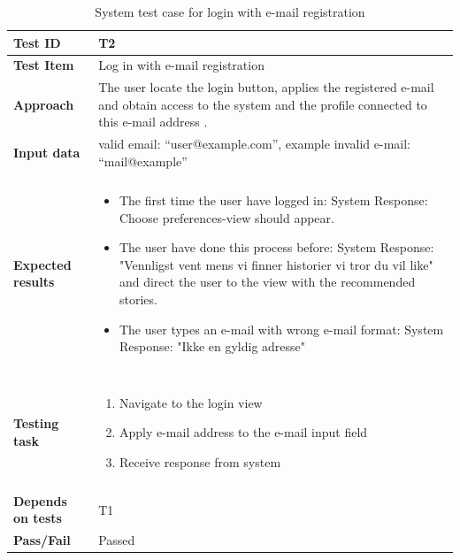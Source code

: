 \begin{appendices}
	\begin{table}[H]
		\small
		\centering
		\caption{System test case for login with e-mail registration}
		\begin{tabular}{ | l | l  |}
			\hline
			\textbf{Test ID} & T2  \\ \hline 
			\textbf{Test Item} & Log in with e-mail registration \\ \hline
			\textbf{Approach} & \begin{minipage}{5in}The user locate the login button, applies the registered e-mail and obtain access to the system and the profile connected to this e-mail address . \end{minipage}\\ \hline
			\textbf{Input data} &  valid email: “user@example.com”, \newline example invalid e-mail: “mail@example”\\ \hline&\\[-3.8ex]
			\textbf{Expected results} & \begin{minipage}{5in}
			\begin{itemize}[noitemsep]
				\item The first time the user have logged in: \newline System Response:  Choose preferences-view should appear.
				\item The user have done this process before: \newline System Response: "Vennligst vent mens vi finner historier vi tror du vil like" and direct the user to the view with the recommended stories.
				\item The user types an e-mail with wrong e-mail format: \newline System Response: "Ikke en gyldig adresse" 
				
			\end{itemize} \end{minipage}
			 \\ &\\[-3.8ex]\hline&\\[-3.8ex]
			\textbf{Testing task} & \begin{minipage}{5in}
			\begin{enumerate}[noitemsep]
			\item Navigate to the login view
			\item Apply e-mail address to the e-mail input field
			\item Receive response from system
			\end{enumerate}\end{minipage}
			 \\ &\\[-3.8ex]\hline
			\textbf{Depends on tests} & T1 \\ \hline					
			\textbf{Pass/Fail} & Passed \\\hline
		\end{tabular}
	

\end{table}
\end{appendices}
